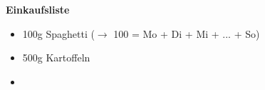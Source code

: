\documentclass[10pt, a4paper]{article}
\begin{document}
\begin{landscape}
\end{landscape}
\newpage
{\Large \textbf{Einkaufsliste}} \medskip \\

\begin{itemize}
	\item 100g Spaghetti ($\rightarrow$ 100 = Mo + Di + Mi + ... + So)
	\item 500g Kartoffeln 
	\item 
\end{itemize}
\end{document}
